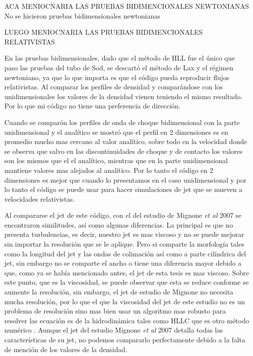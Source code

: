 \documentclass[12pt,a4paper]{book}
\begin{document}
{\color{blue} ACA MENIOCNARIA LAS PRUEBAS BIDIMENCIONALES NEWTONIANAS} {\color{red} No se hicieron pruebas bidimensionales newtonianas}

{\color{blue} LUEGO MENIOCNARIA LAS PRUEBAS BIDIMENCIONALES RELATIVISTAS}

En las pruebas bidimensionales, dado que el método de HLL fue el único que paso las pruebas del tubo de Sod, {\color{red} se descartó el método de Lax y el régimen newtoniano}, ya que lo que importa es que el código pueda 
reproducir flujos relativistas. Al comparar los perfiles de densidad y 
comparándose con los unidimensionales los valores de la densidad vienen teniendo el mismo resultado. Por lo que mi código no tiene una preferencia de dirección.

Cuando se comparón los perfiles de onda de choque bidimensional con la parte unidimensional y el analítico se mostró que  el perfil en 2 dimensiones es en promedio mucho mas cercano al valor analítico, 
sobre todo en la velocidad donde se observa que salvo en las discontinuidades de choque y de contacto los valores son los mismos que el el analítico, mientras que en la parte unidimensional mantiene valores mas alejados al analítico. 
Por lo tanto el código en 2 dimensiones es mejor que cuando lo presentamos en el caso unidimensional y por lo tanto el código se puede usar para hacer simulaciones de jet que se mueven a  velocidades relativistas.


Al compararse el jet de este código, con el del estudio de Mignone \emph{et al} 2007 se encontraron similitudes, así como algunas diferencias.  La principal es que no presenta turbulencias, es decir, nuestro jet es 
mas viscoso y no se puede mejorar sin importar la resolución que se le aplique. Pero si comparte la morfología tales como la longitud del jet y las ondas de colimación así como a parte cilíndrica del jet, 
sin embargo no se comparte el ancho o tiene una diferencia mayor debido a que, como ya se había mencionado antes, el jet de esta tesis es mas viscoso. Sobre este punto, que es la viscosidad, se puede observar que esta 
se reduce conforme se aumente la resolución, sin embargo, el jet de estudio de Mignone no necesita mucha resolución, por lo que el que la viscosidad del jet de este estudio no es un problema de resolución sino mas 
bien usar un algoritmo mas robusto para resolver las ecuación  es de la hidrodinámica  tales como HLLC que es otro método numérico . Aunque el jet del estudio Mignone \emph{et al} 2007 detalla todas las 
características de su jet, no podemos compararlo perfectamente debido a la falta de mención de los valores de la densidad.
\end{document}
